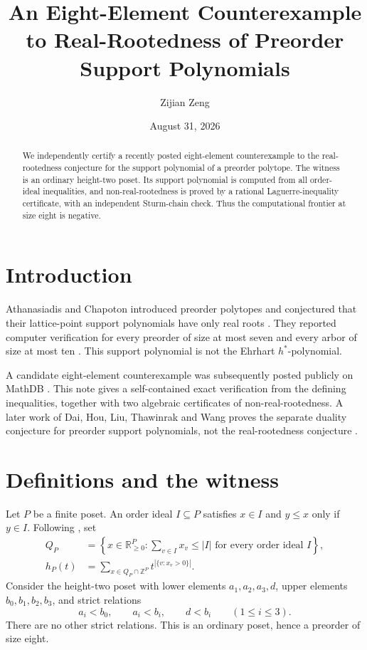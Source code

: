 \documentclass[11pt]{amsart}
\title[A Preorder Support-Polynomial Counterexample]{An Eight-Element Counterexample to Real-Rootedness of Preorder Support Polynomials}
\author{Zijian Zeng}
\date{August 31, 2026}
\begin{document}
\begin{abstract}
We independently certify a recently posted eight-element counterexample to the
real-rootedness conjecture for the support polynomial of a preorder polytope.
The witness is an ordinary height-two poset. Its support polynomial is computed
from all order-ideal inequalities, and non-real-rootedness is proved by a
rational Laguerre-inequality certificate, with an independent Sturm-chain
check. Thus the computational frontier at size eight is negative.
\end{abstract}\maketitle

\section{Introduction}
Athanasiadis and Chapoton introduced preorder polytopes and conjectured that
their lattice-point support polynomials have only real roots
\cite[Conjecture~5.3]{chapoton2026polytopesposetsassociatedpreorders}. They reported computer verification for every
preorder of size at most seven and every arbor of size at most ten
\cite[p.~16]{chapoton2026polytopesposetsassociatedpreorders}. This support polynomial is not the Ehrhart
$h^*$-polynomial.

A candidate eight-element counterexample was subsequently posted publicly on
MathDB \cite{Patel2026}. This note gives a self-contained exact verification
from the defining inequalities, together with two algebraic certificates of
non-real-rootedness. A later work of Dai, Hou, Liu, Thawinrak and Wang proves
the separate duality conjecture for preorder support polynomials, not the
real-rootedness conjecture \cite{dai2026countinglatticepointsminkowski}.

\section{Definitions and the witness}
Let $P$ be a finite poset. An order ideal $I\subseteq P$ satisfies $x\in I$
and $y\le x$ only if $y\in I$. Following \cite{chapoton2026polytopesposetsassociatedpreorders}, set
\begin{align*}
 Q_P&=\left\{x\in\mathbb R_{\ge0}^{P}:\sum_{v\in I}x_v\le |I|
 \text{ for every order ideal }I\right\},\\
 h_P(t)&=\sum_{x\in Q_P\cap\mathbb Z^P}t^{|\{v:x_v>0\}|}.
\end{align*}
Consider the height-two poset with lower elements $a_1,a_2,a_3,d$, upper
elements $b_0,b_1,b_2,b_3$, and strict relations
\begin{equation}\label{eq:relations}
 a_i<b_0,\qquad a_i<b_i,\qquad d<b_i\qquad(1\le i\le3).
\end{equation}
There are no other strict relations. This is an ordinary poset, hence a
preorder of size eight.
\end{document}
